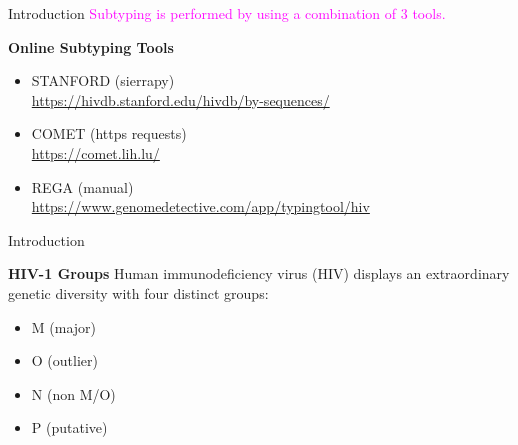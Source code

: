 \documentclass{beamer}
\begin{document}
\begin{frame}{Introduction}
\centering
\textcolor{magenta}{Subtyping is performed by using a combination of 3 tools.}\\
\vspace{10pt}
\begin{block}{\textbf{Online Subtyping Tools}}
\begin{itemize}
\item STANFORD (sierrapy)\\ 
\href{https://hivdb.stanford.edu/hivdb/by-sequences/}{https://hivdb.stanford.edu/hivdb/by-sequences/}
\item COMET (https requests)\\
\href{https://comet.lih.lu/}{https://comet.lih.lu/}
\item REGA (manual)\\ 
\href{https://www.genomedetective.com/app/typingtool/hiv}{https://www.genomedetective.com/app/typingtool/hiv}
\end{itemize}
\end{block}  
\end{frame}


\begin{frame}{Introduction}
\begin{block}{\textbf{HIV-1 Groups}}
Human immunodeficiency virus (HIV) displays an extraordinary genetic diversity with four distinct groups: 
\begin{itemize}
\item M (major)
\item O (outlier)
\item N (non M/O)
\item P (putative)
\end{itemize}
\end{block}  
\end{frame}
\end{document}
